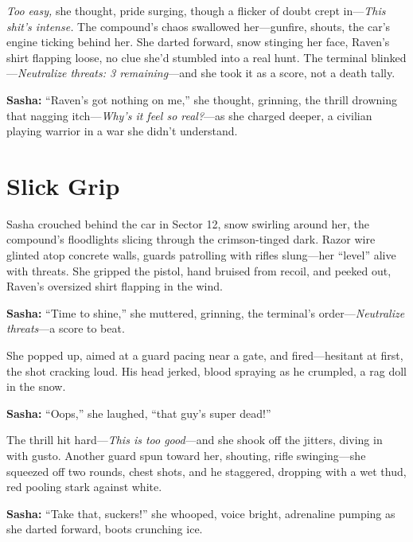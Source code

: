 \documentclass[12pt]{book}
\begin{document}
\emph{Too easy,} she thought, pride surging, though a flicker of doubt crept in—\emph{This shit’s intense.} The compound’s chaos swallowed her—gunfire, shouts, the car’s engine ticking behind her. She darted forward, snow stinging her face, Raven’s shirt flapping loose, no clue she’d stumbled into a real hunt. The terminal blinked—\emph{Neutralize threats: 3 remaining}—and she took it as a score, not a death tally. 

\vspace{0.5em}
\textbf{Sasha:} “Raven’s got nothing on me,” she thought, grinning, the thrill drowning that nagging itch—\emph{Why’s it feel so real?}—as she charged deeper, a civilian playing warrior in a war she didn’t understand.

\vspace{1em}

\section{Slick Grip}

Sasha crouched behind the car in Sector 12, snow swirling around her, the compound’s floodlights slicing through the crimson-tinged dark. Razor wire glinted atop concrete walls, guards patrolling with rifles slung—her “level” alive with threats. She gripped the pistol, hand bruised from recoil, and peeked out, Raven’s oversized shirt flapping in the wind. 

\vspace{0.5em}
\textbf{Sasha:} “Time to shine,” she muttered, grinning, the terminal’s order—\emph{Neutralize threats}—a score to beat.

She popped up, aimed at a guard pacing near a gate, and fired—hesitant at first, the shot cracking loud. His head jerked, blood spraying as he crumpled, a rag doll in the snow. 

\vspace{0.5em}
\textbf{Sasha:} “Oops,” she laughed, “that guy’s super dead!”

The thrill hit hard—\emph{This is too good}—and she shook off the jitters, diving in with gusto. Another guard spun toward her, shouting, rifle swinging—she squeezed off two rounds, chest shots, and he staggered, dropping with a wet thud, red pooling stark against white. 

\vspace{0.5em}
\textbf{Sasha:} “Take that, suckers!” she whooped, voice bright, adrenaline pumping as she darted forward, boots crunching ice.
\end{document}
